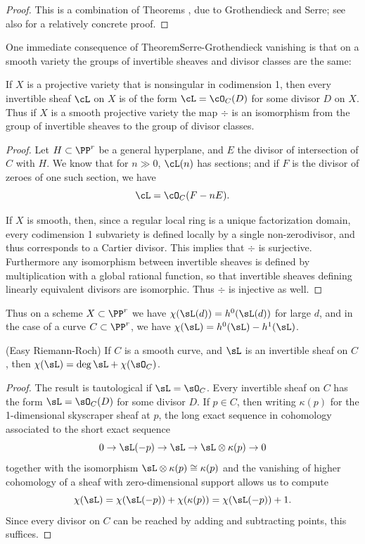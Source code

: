 \begin{proof}
This is a combination of Theorems \cite[Theorems III.2.7 and III.5.2]{Hartshorne1977}, due to Grothendieck and Serre; see also \cite{Serre1955} for a relatively concrete proof.
\end{proof}

One immediate consequence of Theorem{Serre-Grothendieck vanishing} is that on a smooth variety the groups of invertible sheaves and divisor classes are the same:

\begin{corollary}\label{invertible sheaves and divisors}
If $X$ is a projective variety that is nonsingular in codimension 1, then every invertible sheaf $\cL$ on $X$ is of the form $\cL = \cO_C(D)$ for some divisor $D$ on $X$. Thus if $X$ is a smooth projective variety the map $\div$ is an isomorphism from the group of invertible sheaves to the group
of divisor classes.
\end{corollary}

\begin{proof}
Let $H \subset \PP^r$ be a general hyperplane, and $E$  the divisor  of intersection of $C$ with $H$. We know that for $n \gg 0$, $\cL(n)$ has sections; and if $F$ is the divisor of zeroes of one such section, we have
$$
\cL = \cO_C(F - nE).
$$

If $X$ is smooth, then, since a regular local ring is a unique factorization domain, every codimension 1 subvariety is defined locally
by a single non-zerodivisor, and thus corresponds to a Cartier divisor. This implies that $\div$ is surjective. Furthermore any isomorphism between invertible sheaves 
is defined by multiplication with a global rational function, so that invertible sheaves defining linearly equivalent divisors are
isomorphic. Thus $\div$ is injective as well.
\end{proof}

Thus on a scheme $X\subset \PP^r$ we have $\chi(\sL(d)) = h^0(\sL(d))$ for large $d$, and in the case of a curve $C\subset \PP^r$, we have $\chi(\sL) = h^0(\sL) - h^1(\sL)$. 

\begin{theorem} (Easy Riemann-Roch)\label{easy RR}
If $C$ is a smooth curve, and $\sL$ is an invertible sheaf on $C$, then $\chi(\sL) = \deg \sL + \chi(\sO_C)$.
\end{theorem}

\begin{proof}
 The result is tautological if $\sL = \sO_C$. Every invertible sheaf on $C$ has the form $\sL = \sO_C(D)$ for some
divisor $D$. If $p\in C$, then writing $\kappa(p)$ for the 1-dimensional skyscraper sheaf at $p$, the long exact sequence in cohomology
associated to the short exact sequence
$$
0\to \sL(-p) \to \sL \to \sL\otimes \kappa(p)\to 0
$$
together with the isomorphism $\sL\otimes \kappa(p) \cong \kappa(p)$
and the vanishing of higher cohomology of a sheaf with zero-dimensional support allows us to compute 
$$
\chi(\sL) = \chi(\sL(-p)) + \chi(\kappa(p)) = \chi(\sL(-p)) + 1.
$$
Since every divisor on $C$ can be reached by adding and subtracting points, this suffices.
\end{proof}


